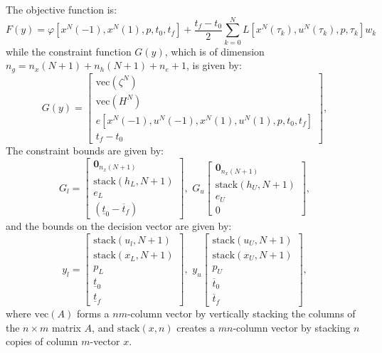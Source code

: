 \documentclass[a4paper,11pt]{report}    %
\begin{document}
The objective function is:
\begin{equation}
 F(y) = \varphi[ x^N(-1), x^N(1), p, t_0, t_f ] + \frac{t_f-t_0}{2}\sum\limits_{k=0}^N L[ x^N(\tau_k), u^N(\tau_k),p,\tau_k] w_k
\end{equation}
while the constraint function $G(y)$, which is of dimension $n_g=n_x(N+1)+n_h(N+1)+n_e+1$, is given by:
\begin{equation}
         G(y) = \begin{bmatrix}
         \mathrm{vec}(\zeta^N) \\
         \mathrm{vec}(H^N) \\
         e[ x^N(-1),u^N(-1),x^N(1),u^N(1),p,t_0, t_f ]  \\
         t_f - t_0
       \end{bmatrix}, 
\end{equation}
The constraint bounds are given by:
\begin{equation}
G_l = \begin{bmatrix} \mathbf{0}_{n_x (N+1)} \\ \mathrm{stack}(h_L,N+1) \\ e_L \\ (\underline{t}_0-\overline{t}_f) \end{bmatrix}, \,\, G_u
\begin{bmatrix} \mathbf{0}_{n_x (N+1)} \\ \mathrm{stack}(h_U,N+1) \\ e_U \\ 0 \end{bmatrix},
\end{equation}
and the bounds on the decision vector are given by:
\begin{equation}
y_l = \begin{bmatrix} \mathrm{stack}(u_l,N+1) \\ \mathrm{stack}(x_L,N+1) \\ p_L \\ \underline{t}_0 \\ \underline{t}_f \end{bmatrix}, \,\, y_u
\begin{bmatrix}\mathrm{stack}(u_U,N+1) \\ \mathrm{stack}(x_U,N+1) \\ p_U \\ \overline{t}_0 \\ \overline{t}_f \end{bmatrix}, 
\end{equation}
where $\mathrm{vec}(A)$ forms a $nm$-column vector by vertically stacking the columns of the $n\times m$ matrix $A$, and $\mathrm{stack}(x,n)$
creates a $mn$-column vector by stacking $n$ copies of column $m$-vector $x$.
\end{document}
